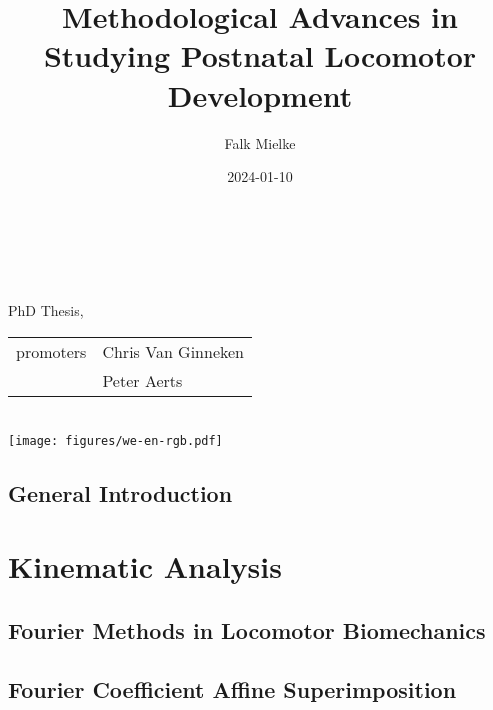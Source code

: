 \documentclass[12pt,a4paper,twoside]{report}
\title{Methodological Advances \linebreak in \linebreak Studying Postnatal Locomotor Development}
\author{Falk Mielke}
\date{2024-01-10}
\newcommand\cleartoleftpage{%
\clearpage
}
\newcommand\cleartorightpage{%
\clearpage
\hbox{}
}
\begin{document}
\doublespacing
\makeatletter
    \begin{titlepage}
    \begin{spacing}{2}
        \begin{center}
        	\ \vspace{3cm}\\
            {\LARGE \bfseries  \@title }\\[6ex] 
            {\large  \@author}\\[8ex] 
            { PhD Thesis, \@date }\\[8ex] 
            \begin{tabular}{r | l}
              promoters & Chris Van Ginneken
               \\ & Peter Aerts
			\end{tabular}\\[12ex]
            {\texttt{[image: figures/we-en-rgb.pdf]}\\[4ex]}
        \end{center}
        \end{spacing}
    \end{titlepage}
\makeatother
\thispagestyle{empty}

\onehalfspacing
\newpage
\setcounter{tocdepth}{1}
\begin{spacing}{1.1}
\tableofcontents
\end{spacing}

\cleartorightpage
\chapter{General Introduction}\label{cpt:generalintro}
\clearpage




\cleartorightpage
\part{Kinematic Analysis}\label{pt:1}
\chapter{Fourier Methods in Locomotor Biomechanics}\label{cpt:fourier_review}


\cleartoleftpage
\chapter{Fourier Coefficient Affine Superimposition}\label{cpt:fcas}

\end{document}
